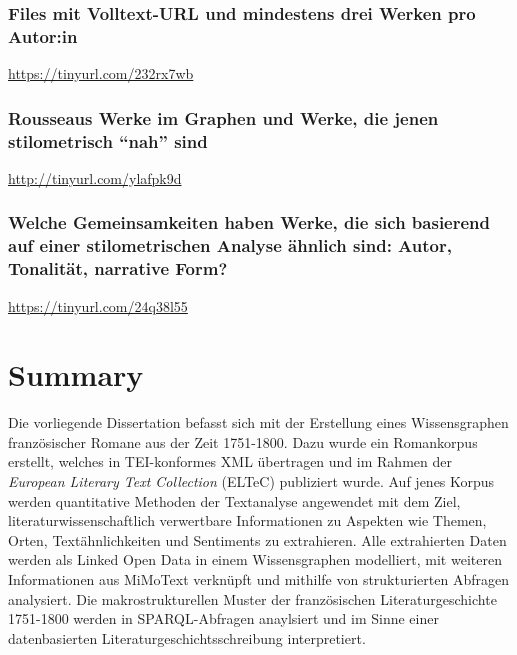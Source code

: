 \documentclass[
  12pt,
  letterpaper,
  DIV=11,
  numbers=noendperiod]{scrreprt}
\begin{document}
\subsection{Files mit Volltext-URL und mindestens drei Werken pro
Autor:in}\label{files-mit-volltext-url-und-mindestens-drei-werken-pro-autorin}

\url{https://tinyurl.com/232rx7wb}

\subsection{Rousseaus Werke im Graphen und Werke, die jenen
stilometrisch ``nah''
sind}\label{rousseaus-werke-im-graphen-und-werke-die-jenen-stilometrisch-nah-sind-1}

\url{http://tinyurl.com/ylafpk9d}

\subsection{Welche Gemeinsamkeiten haben Werke, die sich basierend auf
einer stilometrischen Analyse ähnlich sind: Autor, Tonalität, narrative
Form?}\label{welche-gemeinsamkeiten-haben-werke-die-sich-basierend-auf-einer-stilometrischen-analyse-uxe4hnlich-sind-autor-tonalituxe4t-narrative-form-1}

\url{https://tinyurl.com/24q38l55}


\chapter{Summary}\label{summary}

Die vorliegende Dissertation befasst sich mit der Erstellung eines
Wissensgraphen französischer Romane aus der Zeit 1751-1800. Dazu wurde
ein Romankorpus erstellt, welches in TEI-konformes XML übertragen und im
Rahmen der \emph{European Literary Text Collection} (ELTeC) publiziert
wurde. Auf jenes Korpus werden quantitative Methoden der Textanalyse
angewendet mit dem Ziel, literaturwissenschaftlich verwertbare
Informationen zu Aspekten wie Themen, Orten, Textähnlichkeiten und
Sentiments zu extrahieren. Alle extrahierten Daten werden als Linked
Open Data in einem Wissensgraphen modelliert, mit weiteren Informationen
aus MiMoText verknüpft und mithilfe von strukturierten Abfragen
analysiert. Die makrostrukturellen Muster der französischen
Literaturgeschichte 1751-1800 werden in SPARQL-Abfragen anaylsiert und
im Sinne einer datenbasierten Literaturgeschichtsschreibung
interpretiert.
\end{document}
